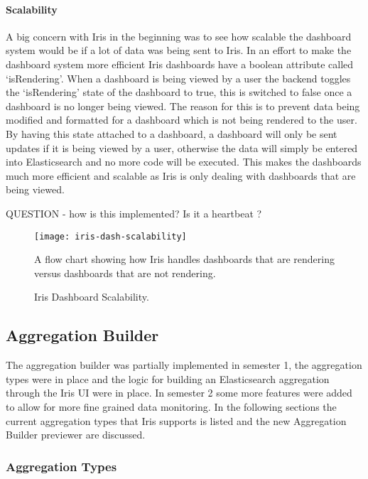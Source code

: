 \documentclass[12pt,a4paper,titlepage]{report}
\begin{document}
\paragraph{Scalability}
A big concern with Iris in the beginning was to see how scalable the dashboard system would be if a lot of data was being sent to Iris. In an effort to make the dashboard system more efficient Iris dashboards have a boolean attribute called `isRendering'. When a dashboard is being viewed by a user the backend toggles the `isRendering' state of the dashboard to true, this is switched to false once a dashboard is no longer being viewed. The reason for this is to prevent data being modified and formatted for a dashboard which is not being rendered to the user. By having this state attached to a dashboard, a dashboard will only be sent updates if it is being viewed by a user, otherwise the data will simply be entered into Elasticsearch and no more code will be executed. This makes the dashboards much more efficient and scalable as Iris is only dealing with dashboards that are being viewed.


QUESTION - how is this implemented? Is it a heartbeat ?

\begin{figure}[H]
\begin{tcolorbox}
\begin{center}
\texttt{[image: iris-dash-scalability]}
\end{center}
A flow chart showing how Iris handles dashboards that are rendering versus dashboards that are not rendering.
\end{tcolorbox}
\caption{Iris Dashboard Scalability.}
\end{figure}

\subsection{Aggregation Builder}
The aggregation builder was partially implemented in semester 1, the aggregation types were in place and the logic for building an Elasticsearch aggregation through the Iris UI were in place. In semester 2 some more features were added to allow for more fine grained data monitoring. In the following sections the current aggregation types that Iris supports is listed and the new Aggregation Builder previewer are discussed.

\subsubsection{Aggregation Types}
\end{document}
